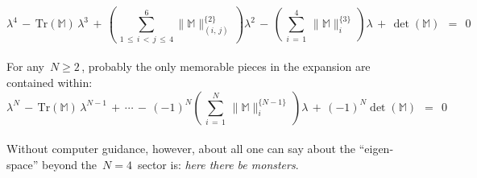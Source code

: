 \documentclass[11pt]{gthesis2}  %
\begin{document}
%
\begin{equation}\label{eq:nifty3}
%
\lambda^{4}\,-\,\text{Tr}(\mathbb{M})\,\lambda^{3}
\,+\,\left(\,\sum_{1\,\leq \,i\, < \,j\, \leq\,
4}^{6}\!\!\!\!\!\!\|\mathbb{M}\|^{\{2\}}_{(i,\,j)}\,
\right)\lambda^{2}\,-\,
\left(\,\sum_{i\,=\,1}^{4}\,\|\mathbb{M}\|^{\{3\}}_{i}
\,\right)\lambda \,+\,\det(\mathbb{M})\;\,=\;\,0
%
\end{equation}
%
\\
For any $\,N \geq 2\,$, probably the only memorable pieces in the
expansion are contained within:
\\
\begin{equation}\label{eq:notsonifty4}
%
\lambda^{N}\,-\,\text{Tr}(\mathbb{M})\,\lambda^{N-1}
\,+\,\cdots\,-\,(-1)^{N}
\left(\,\sum_{i\,=\,1}^{N}\,\|\mathbb{M}\|^{\{N-1\}}_{i}
\,\right)\lambda \,+\,(-1)^{N}\det(\mathbb{M})\;\,=\;\,0
%
\end{equation}
\\
Without computer guidance, however, about all one can say about
the ``eigen-space'' beyond the $\,N = 4\,$ sector is: \emph{here
there be monsters}.
%
\newpage%
%
%
\end{document}
